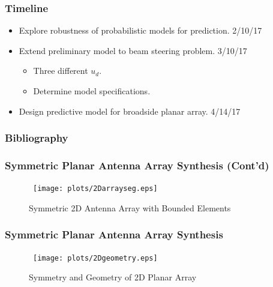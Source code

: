 \documentclass[...]{beamer}
\begin{document}
\begin{frame}
  \frametitle{Timeline}

  \begin{itemize}
    \item Explore robustness of probabilistic models for prediction. 2/10/17
    \item Extend preliminary model to beam steering problem. 3/10/17
      \begin{itemize}
        \item Three different $u_d$.
        \item Determine model specifications.
      \end{itemize}
    \item Design predictive model for broadside planar array. 4/14/17
  \end{itemize}

\end{frame}



\begin{frame}[allowframebreaks]
  \frametitle{Bibliography}
  
  
\end{frame}

\appendix

\begin{frame}
  \frametitle{Symmetric Planar Antenna Array Synthesis (Cont'd)}

\begin{figure}
  \centerline{\hbox{ \hspace{0.0in}
      \texttt{[image: plots/2Darrayseg.eps]}
    }
  }
  \caption {Symmetric 2D Antenna Array with Bounded Elements} \label{fig:2Darrayseg}
\end{figure}

\end{frame}

\begin{frame}
  \frametitle{Symmetric Planar Antenna Array Synthesis}

\begin{figure}
  \centerline{\hbox{ \hspace{0.0in}
      \texttt{[image: plots/2Dgeometry.eps]}
    }
  }
  \caption {Symmetry and Geometry of 2D Planar Array} \label{fig:2Dgeometry}
\end{figure}

\end{frame}
\end{document}

